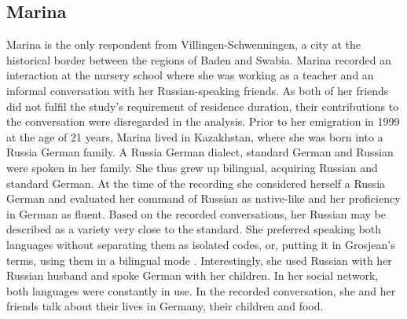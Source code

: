 \subsection{Marina}
Marina is the only respondent from Villingen-Schwenningen, a city at the historical border between the regions of  Baden and Swabia. Marina recorded an interaction at the nursery school where she was working as a teacher and an informal conversation with her Russian-speaking friends. As both of her friends did not fulfil the study's requirement of residence duration, their contributions to the conversation were disregarded in the analysis. Prior to her emigration in 1999 at the age of 21 years, Marina lived in Kazakhstan, where she was born into a Russia German family. A Russia German dialect, standard German and Russian were spoken in her family. She thus grew up bilingual, acquiring Russian and standard German. At the time of the recording she considered herself a Russia German and evaluated her command of Russian as native-like and her proficiency in German as fluent. Based on the recorded conversations, her Russian may be described as a variety very close to the standard. She preferred speaking both languages without separating them as isolated codes, or, putting it in Grosjean's terms, using them in a bilingual mode \citep[cf.][]{grosjean85}. Interestingly, she used Russian with her Russian husband and spoke German with her children. In her social network, both languages were constantly in use. In the recorded conversation, she and her friends talk about their lives in Germany, their children and food.


